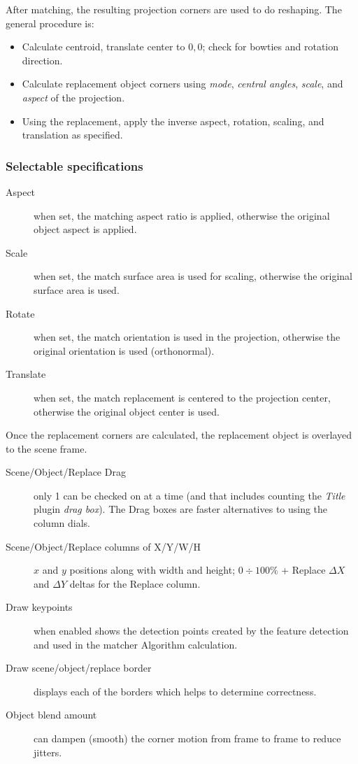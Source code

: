 After matching, the resulting projection corners are used to do reshaping. The general procedure is:

\begin{itemize}[noitemsep]
    \item Calculate centroid, translate center to $0,0$; check for bowties and rotation direction.
    \item Calculate replacement object corners using \textit{mode}, \textit{central angles}, \textit{scale}, and \textit{aspect} of the projection.
    \item Using the replacement, apply the inverse aspect, rotation, scaling, and translation as specified.
\end{itemize}

\subsubsection*{Selectable specifications}%
\label{ssub:selectable_specifications}

\begin{description}
    \item[Aspect] when set, the matching aspect ratio is applied, otherwise the original object aspect is applied.
    \item[Scale] when set, the match surface area is used for scaling, otherwise the original surface area is used.
    \item[Rotate] when set, the match orientation is used in the projection, otherwise the original orientation is used (orthonormal).
    \item[Translate] when set, the match replacement is centered to the projection center, otherwise the original object center is used.
\end{description}

Once the replacement corners are calculated, the replacement object is overlayed to the scene frame.

\begin{description}
    \item[Scene/Object/Replace Drag] only 1 can be checked on at a time (and that includes counting the \textit{Title}
    plugin \textit{drag box}). The Drag boxes are faster alternatives to using the column dials.
    \item[Scene/Object/Replace columns of X/Y/W/H] $x$ and $y$ positions along with width and height; $0\div100\%$ + Replace $\Delta X$ and $\Delta Y$ deltas for the Replace column.
    \item[Draw keypoints] when enabled shows the detection points created by the feature detection and used in the matcher Algorithm calculation.
    \item[Draw scene/object/replace border] displays each of the borders which helps to determine correctness.
    \item[Object blend amount] can dampen (smooth) the corner motion from frame to frame to reduce jitters.
\end{description}

